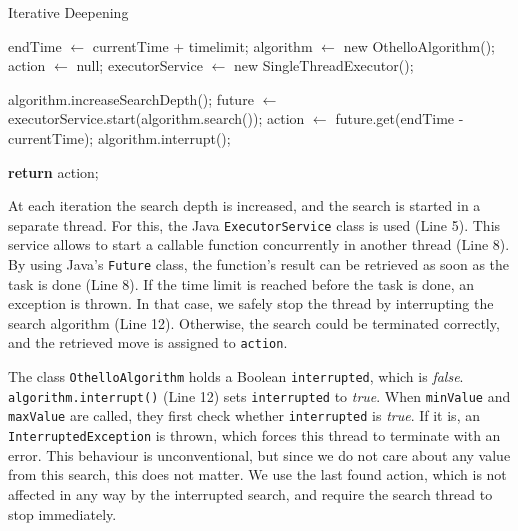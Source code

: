 \begin{algorithm}[H]
    \caption{Iterative Deepening}
    \label{alg:time}
    \begin{algorithmic}[1]
            \State endTime $\leftarrow$ currentTime + timelimit;
            \State algorithm $\leftarrow$ new OthelloAlgorithm();
            \State action $\leftarrow$ null;
            \State executorService $\leftarrow$ new SingleThreadExecutor(); \label{lst:service}
            
             \label{lst:while}
                \State algorithm.increaseSearchDepth();
                \State future $\leftarrow$ executorService.start(algorithm.search()); \label{lst:future}
                \try
                    \State action $\leftarrow$ future.get(endTime - currentTime);
                    \State algorithm.interrupt(); \label{lst:interrupt}
                \endtry
            \EndWhile 
            
            \State \textbf{return} action;
        \EndFunction
    \end{algorithmic}
\end{algorithm}

At each iteration the search depth is increased, and the search is started in a separate thread.
For this, the Java \texttt{ExecutorService} class is used (Line 5).
This service allows to start a callable function concurrently in another thread (Line 8).
By using Java's \texttt{Future} class, the function's result can be retrieved as soon as the task is done (Line 8).
If the time limit is reached before the task is done, an exception is thrown.
In that case, we safely stop the thread by interrupting the search algorithm (Line 12).
Otherwise, the search could be terminated correctly, and the retrieved move is assigned to \texttt{action}.

The class \texttt{OthelloAlgorithm} holds a Boolean \texttt{interrupted}, which is \textit{false}.
\texttt{algorithm.interrupt()} (Line 12) sets \texttt{interrupted} to \textit{true}.
When \texttt{minValue} and \texttt{maxValue} are called, they first check whether \texttt{interrupted} is \textit{true}.
If it is, an \texttt{InterruptedException} is thrown, which forces this thread to terminate with an error.
This behaviour is unconventional, but since we do not care about any value from this search, this does not matter.
We use the last found action, which is not affected in any way by the interrupted search, and require the search thread to stop immediately.

